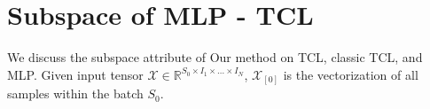 \documentclass{article}
\begin{document}
\section{Subspace of MLP - TCL}
\label{subspace-tcl}
%
%
%
%
%
%
%
%
%
%
%
%


We discuss the subspace attribute of Our method on TCL, classic TCL, and MLP. Given input tensor $\mathcal{X} \in \mathbb{R}^{S_0\times I_1\times\dots\times I_N}$, $\mathcal{X}_{[0]}$ is the vectorization of all samples within the batch $S_0$.
\end{document}

